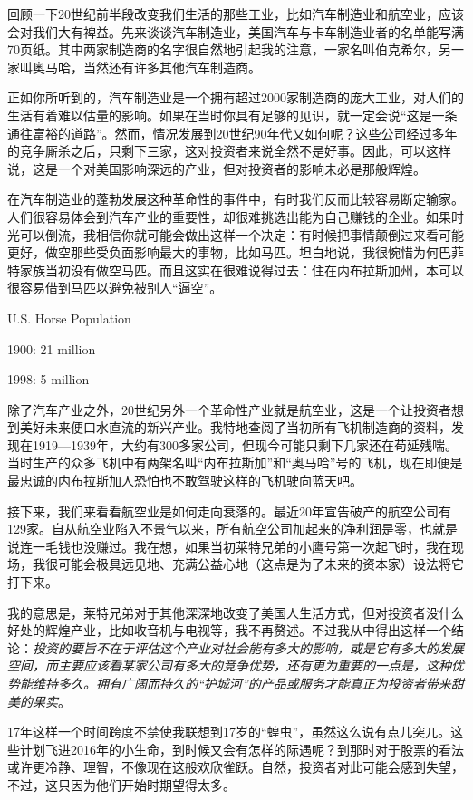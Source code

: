 \documentclass[UTF8,a4paper,zihao=-4,fontset = windows]{ctexart} %
\begin{document}
回顾一下20世纪前半段改变我们生活的那些工业，比如汽车制造业和航空业，应该会对我们大有裨益。先来谈谈汽车制造业，美国汽车与卡车制造业者的名单能写满70页纸。其中两家制造商的名字很自然地引起我的注意，一家名叫伯克希尔，另一家叫奥马哈，当然还有许多其他汽车制造商。

正如你所听到的，汽车制造业是一个拥有超过2000家制造商的庞大工业，对人们的生活有着难以估量的影响。如果在当时你具有足够的见识，就一定会说“这是一条通往富裕的道路”。然而，情况发展到20世纪90年代又如何呢？这些公司经过多年的竞争厮杀之后，只剩下三家，这对投资者来说全然不是好事。因此，可以这样说，这是一个对美国影响深远的产业，但对投资者的影响未必是那般辉煌。

在汽车制造业的蓬勃发展这种革命性的事件中，有时我们反而比较容易断定输家。人们很容易体会到汽车产业的重要性，却很难挑选出能为自己赚钱的企业。如果时光可以倒流，我相信你就可能会做出这样一个决定：有时候把事情颠倒过来看可能更好，做空那些受负面影响最大的事物，比如马匹。坦白地说，我很惋惜为何巴菲特家族当初没有做空马匹。而且这实在很难说得过去：住在内布拉斯加州，本可以很容易借到马匹以避免被别人“逼空”。

U.S. Horse Population

1900: 21 million

1998: 5 million

除了汽车产业之外，20世纪另外一个革命性产业就是航空业，这是一个让投资者想到美好未来便口水直流的新兴产业。我特地查阅了当初所有飞机制造商的资料，发现在1919—1939年，大约有300多家公司，但现今可能只剩下几家还在苟延残喘。当时生产的众多飞机中有两架名叫“内布拉斯加”和“奥马哈”号的飞机，现在即便是最忠诚的内布拉斯加人恐怕也不敢驾驶这样的飞机驶向蓝天吧。

接下来，我们来看看航空业是如何走向衰落的。最近20年宣告破产的航空公司有129家。自从航空业陷入不景气以来，所有航空公司加起来的净利润是零，也就是说连一毛钱也没赚过。我在想，如果当初莱特兄弟的小鹰号第一次起飞时，我在现场，我很可能会极具远见地、充满公益心地（这点是为了未来的资本家）设法将它打下来。

我的意思是，莱特兄弟对于其他深深地改变了美国人生活方式，但对投资者没什么好处的辉煌产业，比如收音机与电视等，我不再赘述。不过我从中得出这样一个结论：\textit{投资的要旨不在于评估这个产业对社会能有多大的影响，或是它有多大的发展空间，而主要应该看某家公司有多大的竞争优势，还有更为重要的一点是，这种优势能维持多久。拥有广阔而持久的“护城河”的产品或服务才能真正为投资者带来甜美的果实}。

17年这样一个时间跨度不禁使我联想到17岁的“蝗虫”，虽然这么说有点儿突兀。这些计划飞进2016年的小生命，到时候又会有怎样的际遇呢？到那时对于股票的看法或许更冷静、理智，不像现在这般欢欣雀跃。自然，投资者对此可能会感到失望，不过，这只因为他们开始时期望得太多。
\end{document}
